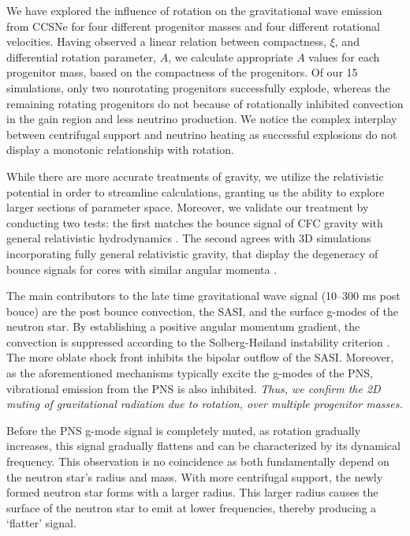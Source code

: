 \documentclass[twocolumn,times]{aastex62}  %
\begin{document}
We have explored the influence of rotation on the gravitational wave emission from CCSNe for four different progenitor masses and four different rotational velocities.  Having observed a linear relation between compactness, $\xi$, and differential rotation parameter, $A$, we calculate appropriate $A$ values for each progenitor mass, based on the compactness of the \citet{Suk:2016} progenitors.  Of our 15 simulations, only two nonrotating progenitors successfully explode, whereas the remaining rotating progenitors do not because of rotationally inhibited convection in the gain region and less neutrino production.  We notice the complex interplay between centrifugal support and neutrino heating as successful explosions do not display a monotonic relationship with rotation.

While there are more accurate treatments of gravity, we utilize the relativistic potential in order to streamline calculations, granting us the ability to explore larger sections of parameter space. Moreover, we validate our treatment by conducting two tests: the first matches the bounce signal of CFC gravity with general relativistic hydrodynamics \citep{richers:2017}.  The second agrees with 3D simulations incorporating fully general relativistic gravity, that display the degeneracy of bounce signals for cores with similar angular momenta \citep{ott:2012}.  

The main contributors to the late time gravitational wave signal (10--300 ms post bouce) are the post bounce convection, the SASI, and the surface g-modes of the neutron star.  By establishing a positive angular momentum gradient, the convection is suppressed according to the Solberg-H{\o}iland instability criterion \citep{endal:1978,fryer:2000}.  The more oblate shock front inhibits the bipolar outflow of the SASI.  Moreover, as the aforementioned mechanisms typically excite the g-modes of the PNS, vibrational emission from the PNS is also inhibited.  \textit{Thus, we confirm the 2D muting of gravitational radiation due to rotation, over multiple progenitor masses.}  

Before the PNS g-mode signal is completely muted, as rotation gradually increases, this signal gradually flattens and can be characterized by its dynamical frequency.  This observation is no coincidence as both  fundamentally depend on the neutron star's radius and mass.  With more centrifugal support, the newly formed neutron star forms with a larger radius.  This larger radius causes the surface of the neutron star to emit at lower frequencies, thereby producing a `flatter' signal.
\end{document}
